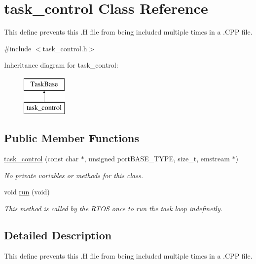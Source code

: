 \hypertarget{classtask__control}{\section{task\-\_\-control Class Reference}
\label{classtask__control}
}


This define prevents this .H file from being included multiple times in a .C\-P\-P file.  




{\ttfamily \#include $<$task\-\_\-control.\-h$>$}

Inheritance diagram for task\-\_\-control\-:\begin{figure}[H]
\begin{center}
\leavevmode
\includegraphics[height=2.000000cm]{classtask__control}
\end{center}
\end{figure}
\subsection*{Public Member Functions}
\begin{DoxyCompactItemize}
\item 
\hyperlink{classtask__control_ad5b95fef0925c84303b5459fdde3b06c}{task\-\_\-control} (const char $\ast$, unsigned port\-B\-A\-S\-E\-\_\-\-T\-Y\-P\-E, size\-\_\-t, emstream $\ast$)
\begin{DoxyCompactList}\small\item\em No private variables or methods for this class. \end{DoxyCompactList}\item 
void \hyperlink{classtask__control_aae84f350fe4cf1de440d2f37e544612c}{run} (void)
\begin{DoxyCompactList}\small\item\em This method is called by the R\-T\-O\-S once to run the task loop indefinetly. \end{DoxyCompactList}\end{DoxyCompactItemize}


\subsection{Detailed Description}
This define prevents this .H file from being included multiple times in a .C\-P\-P file. 

